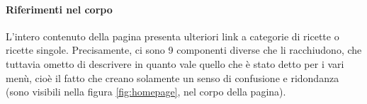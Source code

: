 \paragraph{Riferimenti nel corpo}

L'intero contenuto della pagina presenta ulteriori link a categorie di ricette o ricette singole. Precisamente, ci sono 9 componenti diverse che li racchiudono, che tuttavia ometto di descrivere in quanto vale quello che è stato detto per i vari menù, cioè il fatto che creano solamente un senso di confusione e ridondanza
(sono visibili nella figura \ref{fig:homepage}, nel corpo della pagina).



